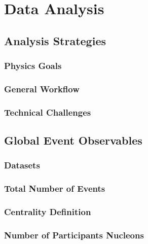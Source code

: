 \chapter{Data Analysis}

\section{Analysis Strategies}

\subsection{Physics Goals}

\subsection{General Workflow}

\subsection{Technical Challenges}

\section{Global Event Observables} 

\subsection{Datasets}

\subsection{Total Number of Events}

\subsection{Centrality Definition}

\subsection{Number of Participants Nucleons}

